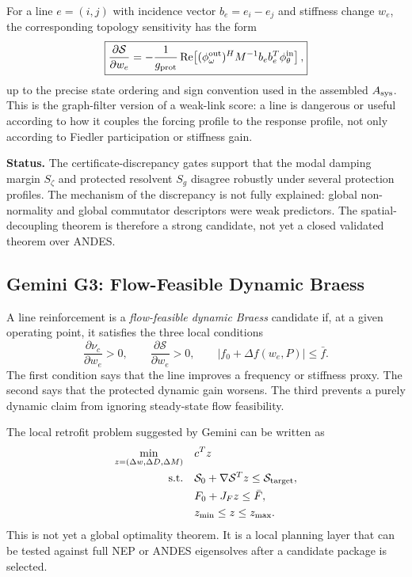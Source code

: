 \documentclass[11pt]{article}
\begin{document}
For a line $e=(i,j)$ with incidence vector $b_e=e_i-e_j$ and stiffness change
$w_e$, the corresponding topology sensitivity has the form
\[
    \boxed{
    \frac{\partial \mathcal S}{\partial w_e}
    =
    -\frac{1}{g_{\rm prot}}
    \operatorname{Re}\!\left[
      (\phi^{\rm out}_{\omega})^H
      M^{-1} b_e b_e^T
      \phi^{\rm in}_{\theta}
    \right],}
\]
up to the precise state ordering and sign convention used in the assembled
$A_{\rm sys}$.  This is the graph-filter version of a weak-link score: a line is
dangerous or useful according to how it couples the forcing profile to the
response profile, not only according to Fiedler participation or stiffness gain.

\textbf{Status.} The certificate-discrepancy gates support that the modal damping
margin $S_\zeta$ and protected resolvent $S_g$ disagree robustly under several
protection profiles.  The mechanism of the discrepancy is not fully explained:
global non-normality and global commutator descriptors were weak predictors.
The spatial-decoupling theorem is therefore a strong candidate, not yet a closed
validated theorem over ANDES.

\subsection{Gemini G3: Flow-Feasible Dynamic Braess}

A line reinforcement is a \emph{flow-feasible dynamic Braess} candidate if, at a
given operating point, it satisfies the three local conditions
\[
    \frac{\partial \nu_c}{\partial w_e}>0,
    \qquad
    \frac{\partial \mathcal S}{\partial w_e}>0,
    \qquad
    |f_0+\Delta f(w_e,P)|\leq \bar f .
\]
The first condition says that the line improves a frequency or stiffness proxy.
The second says that the protected dynamic gain worsens.  The third prevents a
purely dynamic claim from ignoring steady-state flow feasibility.

The local retrofit problem suggested by Gemini can be written as
\[
    \begin{aligned}
    \min_{z=(\Delta w,\Delta D,\Delta M)}\quad & c^Tz\\
    \text{s.t.}\quad
       & \mathcal S_0+\nabla\mathcal S^Tz \leq \mathcal S_{\rm target},\\
       & F_0+J_F z \leq \bar F,\\
       & z_{\min}\leq z\leq z_{\max}.
    \end{aligned}
\]
This is not yet a global optimality theorem.  It is a local planning layer that
can be tested against full NEP or ANDES eigensolves after a candidate package is
selected.
\end{document}
